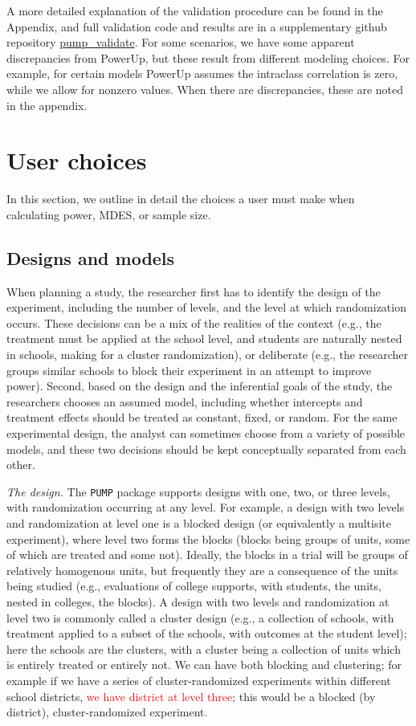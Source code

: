 \documentclass[
]{article}
\begin{document}
A more detailed explanation of the validation procedure can be found in
the Appendix, and full validation code and results are in a
supplementary github repository
\href{https://github.com/MDRCNY/pump_validate}{pump\_validate}. For some
scenarios, we have some apparent discrepancies from PowerUp, but these
result from different modeling choices. For example, for certain models
PowerUp assumes the intraclass correlation is zero, while we allow for
nonzero values. When there are discrepancies, these are noted in the
appendix.

\section{User choices}
\label{sec:choices}

In this section, we outline in detail the choices a user must make when
calculating power, MDES, or sample size.

\subsection{Designs and models}
\label{sec:d_m}

When planning a study, the researcher first has to identify the design
of the experiment, including the number of levels, and the level at
which randomization occurs. These decisions can be a mix of the
realities of the context (e.g., the treatment must be applied at the
school level, and students are naturally nested in schools, making for a
cluster randomization), or deliberate (e.g., the researcher groups
similar schools to block their experiment in an attempt to improve
power). Second, based on the design and the inferential goals of the
study, the researchers chooses an assumed model, including whether
intercepts and treatment effects should be treated as constant, fixed,
or random. For the same experimental design, the analyst can sometimes
choose from a variety of possible models, and these two decisions should
be kept conceptually separated from each other.

\emph{The design.} The \texttt{PUMP} package supports designs with one,
two, or three levels, with randomization occurring at any level. For
example, a design with two levels and randomization at level one is a
blocked design (or equivalently a multisite experiment), where level two
forms the blocks (blocks being groups of units, some of which are
treated and some not). Ideally, the blocks in a trial will be groups of
relatively homogenous units, but frequently they are a consequence of
the units being studied (e.g., evaluations of college supports, with
students, the units, nested in colleges, the blocks). A design with two
levels and randomization at level two is commonly called a cluster
design (e.g., a collection of schools, with treatment applied to a
subset of the schools, with outcomes at the student level); here the
schools are the clusters, with a cluster being a collection of units
which is entirely treated or entirely not. We can have both blocking and
clustering; for example if we have a series of cluster-randomized
experiments within different school districts,
\textcolor{red}{we have district at level three}; this would be a
blocked (by district), cluster-randomized experiment.
\end{document}
